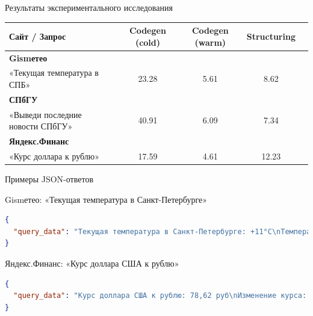 \documentclass
  [ russian
  , aspectratio=1610 %
  ] {beamer}
\begin{document}
\begin{frame}{Результаты экспериментального исследования}
    \begin{table}
        \centering
        \small
        \begin{tabular}{lcccc}
            \toprule
            \textbf{Сайт / Запрос} & \textbf{Codegen (cold)} & \textbf{Codegen (warm)} & \textbf{Structuring} \\
            \midrule
            \textbf{Gismетео} & & & & \\
            «Текущая температура в СПБ»      & 23.28 & 5.61 & 8.62 \\
            \addlinespace
            \textbf{СПбГУ} & & & & \\
            «Выведи последние новости СПбГУ»  & 40.91 & 6.09 & 7.34 \\
            \addlinespace
            \textbf{Яндекс.Финанс} & & & & \\
            «Курс доллара к рублю»           & 17.59 & 4.61 & 12.23 \\
            \bottomrule
        \end{tabular}
    \end{table}
\end{frame}


\begin{frame}[fragile]{Примеры JSON-ответов}
    \begin{block}{Gismетео: «Текущая температура в Санкт-Петербурге»}
\begin{lstlisting}[language=json,breaklines,keepspaces]
{
  "query_data": "Текущая температура в Санкт-Петербурге: +11°C\nТемпература по ощущению: +10°C\n"
}
\end{lstlisting}
    \end{block}

    \begin{block}{Яндекс.Финанс: «Курс доллара США к рублю»}
\begin{lstlisting}[language=json,breaklines,keepspaces]
{
  "query_data": "Курс доллара США к рублю: 78,62 руб\nИзменение курса: −2,88 руб (−3,53%)\nИсточник: ЦБ РФ\n"
}
\end{lstlisting}
    \end{block}
\end{frame}
\end{document}
